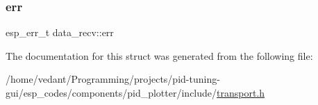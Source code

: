 \mbox{\label{structdata__recv_a96d1938d8172e27035f655727f675273}} 
\subsubsection{\texorpdfstring{err}{err}}
{\footnotesize\ttfamily esp\+\_\+err\+\_\+t data\+\_\+recv\+::err}



The documentation for this struct was generated from the following file\+:\begin{DoxyCompactItemize}
\item 
/home/vedant/\+Programming/projects/pid-\/tuning-\/gui/esp\+\_\+codes/components/pid\+\_\+plotter/include/\hyperlink{transport_8h}{transport.\+h}\end{DoxyCompactItemize}
